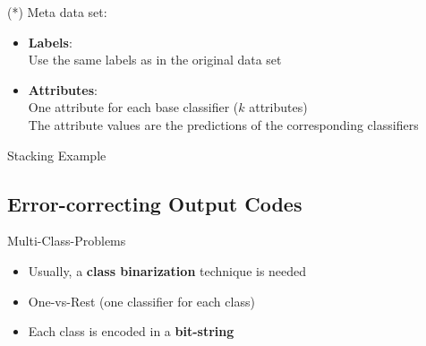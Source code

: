 \begin{frame}[plain]{}{}
	
	
	\vspace*{5mm}
	\footnotesize
	(*) Meta data set:\;
	\begin{itemize}
		\item \textbf{Labels}: \\
			Use the same labels as in the original data set
		\item \textbf{Attributes}: \\
			One attribute for each base classifier ($k$ attributes) \\
			The attribute values are the predictions of the corresponding classifiers
	\end{itemize}
\end{frame}


\begin{frame}{Stacking Example}{}
	\vspace*{-6mm}
	
\end{frame}


\subsection{Error-correcting Output Codes}

\begin{frame}{Multi-Class-Problems}{}\optional
	\begin{itemize}
		\item Usually, a \textbf{class binarization} technique is needed
		\item One-vs-Rest (one classifier for each class)
		\item Each class is encoded in a \textbf{bit-string}
	\end{itemize}
	
	\vspace*{3mm}
\end{frame}


